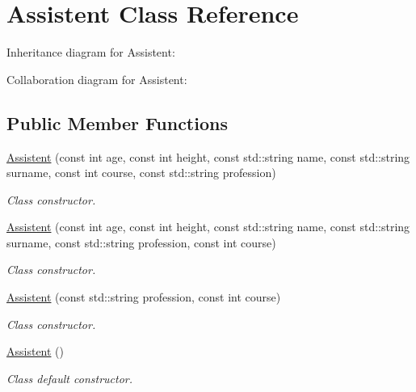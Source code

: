 \hypertarget{classAssistent}{}\section{Assistent Class Reference}
\label{classAssistent}


Inheritance diagram for Assistent\+:


Collaboration diagram for Assistent\+:
\subsection*{Public Member Functions}
\begin{DoxyCompactItemize}
\item 
\hyperlink{classAssistent_a9c294d2c2e77a296a1ee084924a20556}{Assistent} (const int age, const int height, const std\+::string name, const std\+::string surname, const int course, const std\+::string profession)
\begin{DoxyCompactList}\small\item\em Class constructor. \end{DoxyCompactList}\item 
\hyperlink{classAssistent_a4c8edfaa4b12bfccbeb1356ab82fa17c}{Assistent} (const int age, const int height, const std\+::string name, const std\+::string surname, const std\+::string profession, const int course)
\begin{DoxyCompactList}\small\item\em Class constructor. \end{DoxyCompactList}\item 
\hyperlink{classAssistent_a1b01d24ab58eb26fbfc0dc88e0c75255}{Assistent} (const std\+::string profession, const int course)
\begin{DoxyCompactList}\small\item\em Class constructor. \end{DoxyCompactList}\item 
\mbox{\label{classAssistent_ac196ff7c71a1efecdc8f2678246f5b91}} 
\hyperlink{classAssistent_ac196ff7c71a1efecdc8f2678246f5b91}{Assistent} ()
\begin{DoxyCompactList}\small\item\em Class default constructor. \end{DoxyCompactList}\item 
\mbox{\label{classAssistent_a87e86658bb7109b439d28d9694ababde}} 

\end{DoxyCompactItemize}
